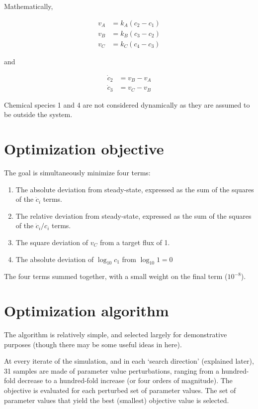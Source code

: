 \documentclass{article}
\begin{document}
Mathematically,

\begin{align}
	v_A &= k_A \left(c_2 - c_1\right)
\\	v_B &= k_B \left(c_3 - c_2\right)
\\	v_C &= k_C \left(c_4 - c_3\right)
\end{align}

and

\begin{align}
	\dot{c}_2 &= v_B - v_A
	\\ \dot{c}_3 &= v_C - v_B
\end{align}

Chemical species 1 and 4 are not considered dynamically as they are assumed to be outside the system.

\section{Optimization objective}

The goal is simultaneously minimize four terms:

\begin{enumerate}
	\item The absolute deviation from steady-state, expressed as the sum of the squares of the \(\dot{c}_i\) terms.
	\item The relative deviation from steady-state, expressed as the sum of the squares of the \(\dot{c}_i/c_i\) terms.
	\item The square deviation of \(v_C\) from a target flux of 1.
	\item The absolute deviation of \(\log_{10} c_1\) from \(\log_{10} 1 = 0\)
\end{enumerate}

The four terms summed together, with a small weight on the final term (\(10^{-8}\)).

\section{Optimization algorithm}

The algorithm is relatively simple, and selected largely for demonstrative purposes (though there may be some useful ideas in here).

At every iterate of the simulation, and in each `search direction' (explained later), 31 samples are made of parameter value perturbations, ranging from a hundred-fold decrease to a hundred-fold increase (or four orders of magnitude).  The objective is evaluated for each perturbed set of parameter values.  The set of parameter values that yield the best (smallest) objective value is selected.
\end{document}
